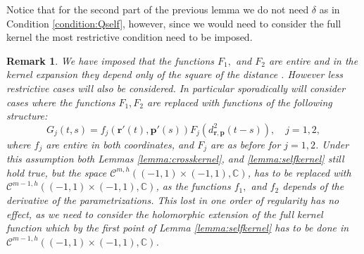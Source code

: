 \documentclass{article}
\newtheorem{remark}[theorem]{Remark}
\newcommand{\IC}{{\mathbb C}}
\newcommand{\bp}{{\bm p}}
\newcommand{\cmspaceh}[4]{\mathcal{C}^{#1,#2} \left( #3, #4 \right)}
\newcommand{\br}{\bm{r}}
\newcommand{\iinterv}{(-1,1)\times(-1,1)}
\begin{document}
Notice that for the second part of the previous lemma we do not need $\delta$ as in Condition \ref{condition:Qself}, however, since we would need to consider the full kernel the most restrictive condition need to be imposed. 
\begin{remark}
\label{remark:lessregularitykernel}
We have imposed that the functions $F_1,$ and $F_2$ are entire and in the kernel expansion they depend only of the square of the distance . However less restrictive cases will also be considered. In particular sporadically will consider cases where the functions $F_1,F_2$ are replaced with functions of the following structure:  
$$
G_j(t,s) = f_j(\br'(t),\bp'(s))F_j(d_{\br,\bp}^2(t-s)), \quad j=1,2,
$$
where $f_j$ are entire in both coordinates, and $F_j$ are as before for $j=1,2$. Under this assumption both Lemmas \ref{lemma:crosskernel}, and \ref{lemma:selfkernel} still hold true, but the space $\cmspaceh{m}{h}{\iinterv}{\IC}$, has to be replaced with $\cmspaceh{m-1}{h}{\iinterv}{\IC}$, as the functions $f_1,$ and $f_2$ depends of the derivative of the parametrizations. This lost in one order of regularity has no effect, as we need to consider the holomorphic extension of the full kernel function which by the first point of Lemma \ref{lemma:selfkernel} has to be done in $\cmspaceh{m-1}{h}{\iinterv}{\IC}$.
\end{remark}
\end{document}
